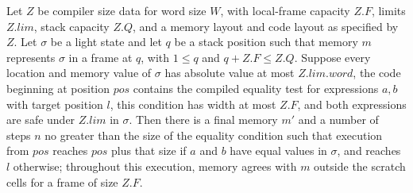 \begin{theorem}
\label{Light.Compiler.decides_eq}
\leanok
{}
Let $Z$ be compiler size data for word size $W$, with local-frame capacity $Z.F$, limits
$Z.lim$, stack capacity $Z.Q$, and a memory layout and code layout as specified by $Z$.
Let $\sigma$ be a light state and let $q$ be a stack position such that memory $m$
represents $\sigma$ in a frame at $q$, with $1 \le q$ and $q+Z.F \le Z.Q$. Suppose
every location and memory value of $\sigma$ has absolute value at most $Z.lim.word$,
the code beginning at position $pos$ contains the compiled equality test for expressions
$a,b$ with target position $l$, this condition has width at most $Z.F$, and both
expressions are safe under $Z.lim$ in $\sigma$. Then there is a final memory $m'$
and a number of steps $n$ no greater than the size of the equality condition such that
execution from $pos$ reaches $pos$ plus that size if $a$ and $b$ have equal values in
$\sigma$, and reaches $l$ otherwise; throughout this execution, memory agrees with
$m$ outside the scratch cells for a frame of size $Z.F$.
\end{theorem}

